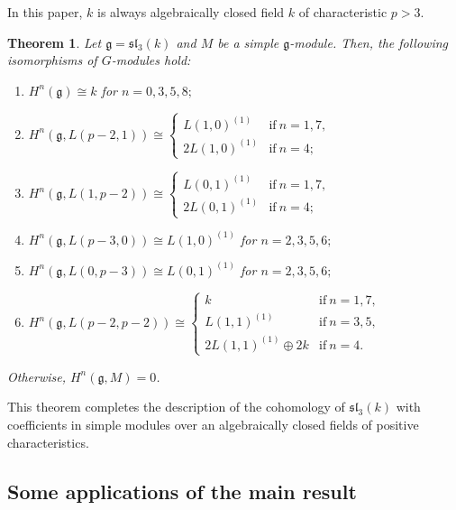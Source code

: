 \documentclass[10pt,a4paper]{amsart}
\numberwithin{equation}{section}
\newtheorem{Theorem}{Theorem}[section]
\begin{document}
In this paper, $k$ is always algebraically closed field $k$ of characteristic
$p>3$.

\begin{Theorem}\label{th1} Let $\mathfrak{g}=\mathfrak{sl}_3(k)$ and $M$ be a simple $\mathfrak{g}$-module. Then, the following isomorphisms of $G$-modules hold:

\begin{enumerate}\itemsep=0pt
\item[$(a)$] $H^n(\mathfrak{g})\cong k$ for $n=0,3,5,8;$

\item[$(b)$] $H^n(\mathfrak{g},L(p-2,1))\cong
\begin{cases}
L(1,0)^{(1)}&\text{if}\ n=1,7,
\\
2L(1,0)^{(1)}&\text{if}\ n=4;\end{cases}$

\item[$(c)$] $H^n(\mathfrak{g},L(1,p-2))\cong
\begin{cases}
L(0,1)^{(1)}&\text{if}\ n=1,7,
\\
2L(0,1)^{(1)}&\text{if}\ n=4;
\end{cases}$

\item[$(d)$] $H^n(\mathfrak{g},L(p-3,0))\cong L(1,0)^{(1)}$ for $n=2,3,5,6;$

\item[$(e)$] $H^n(\mathfrak{g},L(0,p-3))\cong L(0,1)^{(1)}$ for $n=2,3,5,6;$

\item[$(f)$] $H^n(\mathfrak{g},L(p-2,p-2))\cong
\begin{cases}
k&\text{if}\ n=1,7,
\\
L(1,1)^{(1)}&\text{if}\ n=3,5,
\\
2L(1,1)^{(1)}\oplus 2k&\text{if}\ n=4.
\end{cases}$
\end{enumerate}
Otherwise, $H^n(\mathfrak{g},M)=0$.
\end{Theorem}


This theorem completes the description of the cohomology of $\mathfrak{sl}_3(k)$ with coefficients in simple modules over an algebraically closed fields of positive characteristics.

\subsection{Some applications of the main result}
\end{document}
